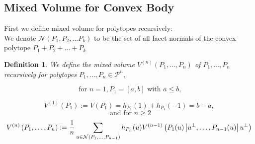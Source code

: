 \documentclass[oneside]{book}
\newtheorem{mydef}{Definition}[section]
\begin{document}
	
	
	
	
	
	
	
	
	
	
	\subsection{Mixed Volume for Convex Body}
	\label{ss:20.5}
	First we define mixed volume for polytopes recursively:  \\
	We denote  $ \mathcal{N}(P_{1},P_{2},\ldots P_{k})$ to be the set of all facet normals of the convex polytope $P_{1}+P_{2}+ \ldots + P_{k}$
	\begin{mydef} \label{d:18}
		We define the mixed volume $V^{(n)}\left(P_{1}, \ldots, P_{n}\right)$ of $P_{1}, \ldots, P_{n}$ recursively for polytopes $P_{1}, \ldots, P_{n} \in \mathcal{P}^{n},$ 
		
		$$ \text{ for } n = 1, P_{1}=[a, b] \text { with } a \leq b,$$ 
		
		\begin{equation}
		\label{eq49}
		V^{(1)}\left(P_{1}\right):=V\left(P_{1}\right)=h_{P_{1}}(1)+h_{P_{1}}(-1) = b - a,  
		\end{equation} 
		$$\text{ and} \text { for } n \geq 2 $$ 
		\begin{equation} \label{eq50}
		\\
		V^{(n)}\left(P_{1}, \ldots, P_{n}\right):=\frac{1}{n} \sum_{u \in \mathcal{N}\left(P_{1}, \ldots, P_{n-1}\right)} h_{P_{n}}(u) V^{(n-1)}\left(P_{1}(u)\left|u^{\perp}, \ldots, P_{n-1}(u)\right| u^{\perp}\right)
		\end{equation}
	\end{mydef}     
\end{document}

